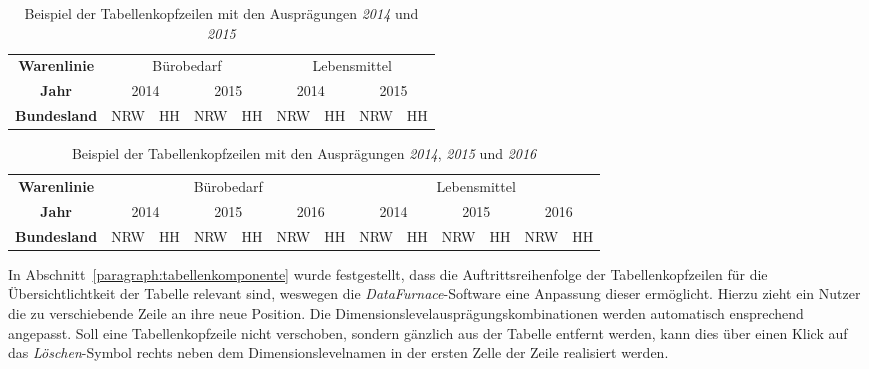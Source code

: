 \documentclass[
  language=german, %
  type=bachelor%
]{isthesis}
\begin{document}
\begin{content}
    \begin{table}[]
      \footnotesize
      \begin{tabular}{c c c c c c c c c}
        \textbf{Warenlinie} & \multicolumn{4}{c}{Bürobedarf} & \multicolumn{4}{c}{Lebensmittel} \\
            \cmidrule(lr){2-5}\cmidrule(lr){6-9}
        \textbf{Jahr} & \multicolumn{2}{c}{2014} & \multicolumn{2}{c}{2015} & \multicolumn{2}{c}{2014} & \multicolumn{2}{c}{2015}\\
            \cmidrule(lr){2-3}\cmidrule(lr){4-5}\cmidrule(lr){6-7}\cmidrule(lr){8-9}
        \textbf{Bundesland} & NRW & HH & NRW & HH & NRW & HH & NRW & HH \\
      \end{tabular}
      \caption{Beispiel der Tabellenkopfzeilen mit den Ausprägungen \textit{2014} und \textit{2015}}\label{table:berichtstabellenkopf20142015}
    \end{table}

    \begin{table}
      \footnotesize
      \begin{tabular}{c c c c c c c c c c c c c}
        \textbf{Warenlinie} & \multicolumn{6}{c}{Bürobedarf} & \multicolumn{6}{c}{Lebensmittel} \\
            \cmidrule(lr){2-7}\cmidrule(lr){8-13}
        \textbf{Jahr} & \multicolumn{2}{c}{2014} & \multicolumn{2}{c}{2015} & \multicolumn{2}{c}{2016} & \multicolumn{2}{c}{2014} & \multicolumn{2}{c}{2015} & \multicolumn{2}{c}{2016}\\
            \cmidrule(lr){2-3}\cmidrule(lr){4-5}\cmidrule(lr){6-7}\cmidrule(lr){8-9}\cmidrule(lr){10-11}\cmidrule(lr){12-13}
        \textbf{Bundesland} & NRW & HH & NRW & HH & NRW & HH & NRW & HH & NRW & HH & NRW & HH \\
      \end{tabular}
      \caption{Beispiel der Tabellenkopfzeilen mit den Ausprägungen \textit{2014}, \textit{2015} und \textit{2016}}\label{table:berichtstabellenkopf201420152016}
    \end{table}

  In Abschnitt~\ref{paragraph:tabellenkomponente} wurde festgestellt, dass die
  Auftrittsreihenfolge der Tabellenkopfzeilen für die Übersichtlichtkeit der
  Tabelle relevant sind, weswegen die \textit{DataFurnace}-Software eine Anpassung
  dieser ermöglicht. Hierzu zieht ein Nutzer die zu
  verschiebende Zeile an ihre neue Position. Die
  Dimensionslevelausprägungskombinationen werden automatisch ensprechend
  angepasst. Soll eine Tabellenkopfzeile nicht verschoben, sondern gänzlich aus
  der Tabelle entfernt werden, kann dies über einen Klick auf das
  \textit{Löschen}-Symbol rechts neben dem Dimensionslevelnamen in der ersten
  Zelle der Zeile realisiert werden.


\end{content}
\end{document}
